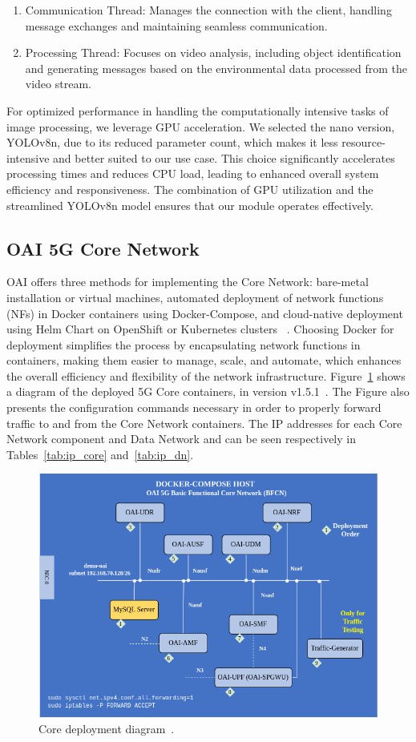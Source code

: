 \begin{enumerate}
\item Communication Thread: Manages the connection with the client, handling message exchanges and maintaining seamless communication.
\item Processing Thread: Focuses on video analysis, including object identification and generating messages based on the environmental data processed from the video stream.
\end{enumerate}

For optimized performance in handling the computationally intensive tasks of image processing, we leverage GPU acceleration.
We selected the nano version, YOLOv8n, due to its reduced parameter count, which makes it less resource-intensive and better suited to our use case.
This choice significantly accelerates processing times and reduces CPU load, leading to enhanced overall system efficiency and responsiveness.
The combination of GPU utilization and the streamlined YOLOv8n model ensures that our module operates effectively.



\subsection{OAI 5G Core Network}\label{subsec:oai-5g-core-network}
OAI offers three methods for implementing the Core Network: bare-metal installation or virtual machines, automated deployment of network functions (NFs) in Docker containers using Docker-Compose, and cloud-native deployment using Helm Chart on OpenShift or Kubernetes clusters ~\cite{oai5gcore}.
Choosing Docker for deployment simplifies the process by encapsulating network functions in containers, making them easier to manage, scale, and automate, which enhances the overall efficiency and flexibility of the network infrastructure.
Figure~\ref{fig:core_depl} shows a diagram of the deployed 5G Core containers, in version v1.5.1~\cite{oai-cn5g-fed-v1.5.1}.
The Figure also presents the configuration commands necessary in order to properly forward traffic to and from the Core Network containers.
The IP addresses for each Core Network component and Data Network and can be seen respectively in Tables~\ref{tab:ip_core} and~\ref{tab:ip_dn}.


\begin{figure}[H]
    \centering
    \includegraphics[width=0.7\linewidth]{figures/core_deply}
    \caption{Core deployment diagram~\cite{oai_cn5g_fed_deploy}.}
    \label{fig:core_depl}
\end{figure}


